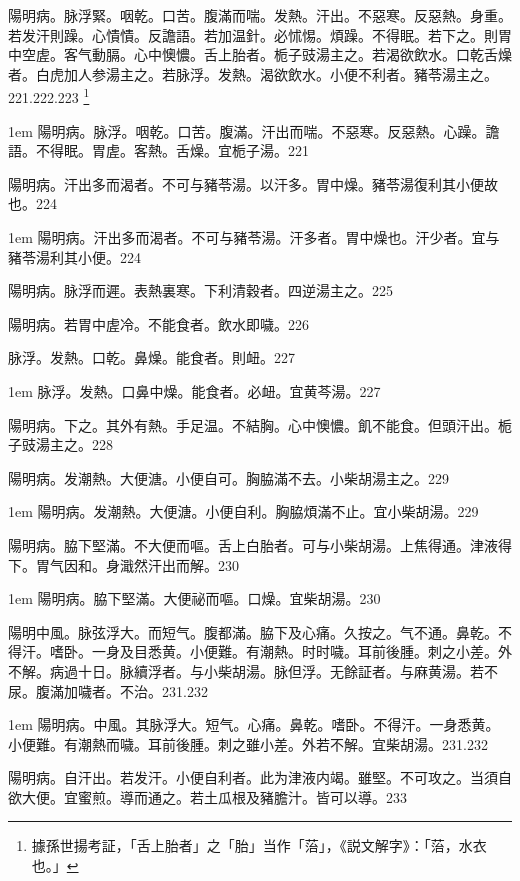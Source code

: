 陽明病。脉浮緊。咽乾。口苦。腹滿而喘。发熱。汗出。不惡寒。反惡熱。身重。若发汗則躁。心憒憒。反譫語。若加温針。必怵惕。煩躁。不得眠。若下之。則胃中空虗。客气動膈。心中懊憹。舌上胎者。栀子{\khaaitp 豉}湯主之。若渴欲飲水。口乾舌燥者。白虎{\khaaitp 加人参}湯主之。若脉浮。发熱。渴欲飲水。小便不利者。豬苓湯主之。221.222.223
	\footnote{
		據孫世揚考証，「舌上胎者」之「胎」当作「菭」，《説文解字》：「菭，水衣也。」
	}

\hangindent 1em
陽明病。脉浮。咽乾。口苦。腹滿。汗出而喘。不惡寒。反惡熱。心躁。譫語。不得眠。胃虗。客熱。舌燥。宜栀子湯。{\gaoben}221

陽明病。汗出多而渴者。不可与豬苓湯。以汗多。胃中燥。豬苓湯復利其小便故也。224

\hangindent 1em
陽明病。汗出多而渴者。不可与豬苓湯。汗多者。胃中燥也。汗少者。宜与豬苓湯利其小便。{\gaoben}224

{\khaaitp 陽明病。}脉浮而遲。表熱裏寒。下利清穀者。四逆湯主之。225

{\khaaitp 陽明病。}若胃中虗冷。不能食者。飲水即噦。226

脉浮。发熱。口乾。鼻燥。能食者。則衄。227

\hangindent 1em
脉浮。发熱。口鼻中燥。能食者。必衄。宜黄芩湯。{\gaoben}227

陽明病。下之。其外有熱。手足温。不結胸。心中懊憹。飢不能食。但頭汗出。栀子{\khaaitp 豉}湯主之。228

陽明病。发潮熱。大便溏。小便自可。胸脇滿不去。小柴胡湯主之。229

\hangindent 1em
陽明病。发潮熱。大便溏。小便自利。胸脇煩滿不止。宜小柴胡湯。{\gaoben}229

陽明病。脇下堅滿。不大便而嘔。舌上白胎者。可与小柴胡湯。上焦得通。津液得下。胃气因和。身濈然汗出而解。230

\hangindent 1em
陽明病。脇下堅滿。大便祕而嘔。口燥。宜柴胡湯。{\gaoben}230

陽明中風。脉弦浮大。而短气。腹都滿。脇下及心痛。久按之。气不通。鼻乾。不得汗。嗜卧。一身及目悉黄。小便難。有潮熱。时时噦。耳前後腫。刺之小差。外不解。病過十日。脉續浮者。与{\khaaitp 小}柴胡湯。脉但浮。无餘証者。与麻黄湯。若不尿。腹滿加噦者。不治。231.232

\hangindent 1em
陽明病。中風。其脉浮大。短气。心痛。鼻乾。嗜卧。不得汗。一身悉黄。小便難。有潮熱而噦。耳前後腫。刺之雖小差。外若不解。宜柴胡湯。{\gaoben}231.232

陽明病。自汗出。若发汗。小便自利者。此为{\khaaitp 津液}内竭。雖堅。不可攻之。当須自欲大便。宜蜜煎。導而通之。若土瓜根及豬膽汁。皆可以導。233

